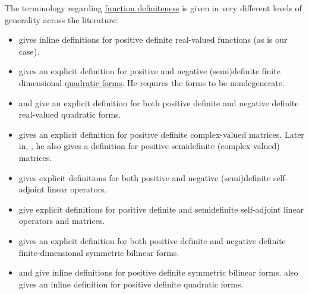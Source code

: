 \begin{remark}\label{rem:real_function_definiteness_terminology}
  The terminology regarding \hyperref[def:real_function_definiteness]{function definiteness} is given in very different levels of generality across the literature:
  \begin{itemize}
    \item \Textcite[17; 271]{Clarke2013OptimalControl} gives inline definitions for positive definite real-valued functions (as is our case).

    \item \Textcite[def. 1.4.7]{Кострикин2020АлгебраЧасть2} gives an explicit definition for positive and negative (semi)definite finite dimensional \hyperref[thm:quadratic_forms]{quadratic forms}. He requires the forms to be nondegenerate.

    \item \Textcite[217]{Винберг2014КурсАлгебры} and \textcite[86]{Обрешков1962ВисшаАлгебра} give an explicit definition for both positive definite and negative definite real-valued quadratic forms.

    \item \Textcite[\S 25.2]{Тыртышников2007ЛинейнаяАлгебра} gives an explicit definition for positive definite complex-valued matrices. Later in, \cite[\S 33.6]{Тыртышников2007ЛинейнаяАлгебра}, he also gives a definition for positive semidefinite (complex-valued) matrices.

    \item \Textcite[107]{Knapp2016BasicAlgebra} gives explicit definitions for both positive and negative (semi)definite self-adjoint linear operators.

    \item \Textcite[374]{FriedbergInselSpence2018LinearAlgebra} give explicit definitions for positive definite and semidefinite self-adjoint linear operators and matrices.

    \item \Textcite[578]{Lang2002Algebra} gives an explicit definition for both positive definite and negative definite finite-dimensional symmetric bilinear forms.

    \item \Textcite[exerc. 6.4.1]{Jacobson1985BasicAlgebraI} and \textcite[def. 8.1.1]{Berger1987GeometryI} give inline definitions for positive definite symmetric bilinear forms. \Textcite[378]{Berger1987GeometryI} also gives an inline definition for positive definite quadratic forms.


\end{itemize}
\end{remark}

